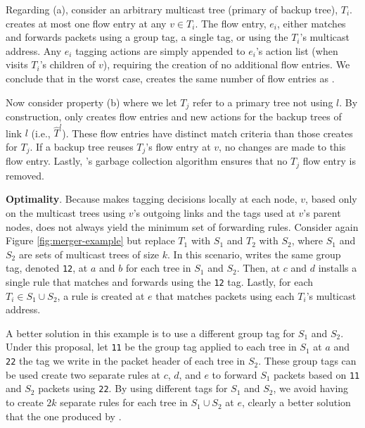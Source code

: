 Regarding (a), consider an arbitrary multicast tree (primary of backup tree), $T_i$. \merge creates at most one flow entry at any $v \in T_i$.  
The flow entry, $e_i$, either matches and forwards packets using a group tag, a single tag, or using the $T_i$'s multicast address.  Any $e_i$ tagging actions 
are simply appended to $e_i$'s action list (when \merge visits $T_i$'s children of $v$), requiring the creation of no additional flow entries.  We conclude that in the worst case,
\merge creates the same number of flow entries as \bases.  

Now consider property (b) where we let $T_j$ refer to a primary tree not using $l$. By construction, \merge only creates flow entries and new actions for the backup trees of 
link $l$ (i.e., $\hat{T}^l$). These flow entries have distinct match criteria than those \merge creates for $T_j$.  If a backup tree reuses $T_j$'s flow entry at $v$, 
no changes are made to this flow entry.  Lastly, \mdrs's garbage collection algorithm ensures that no $T_j$ flow entry is removed.



{\bf Optimality}.  
Because \merge makes tagging decisions locally at each node, $v$, based only on the multicast trees using $v$'s outgoing links and the tags used at $v$'s parent nodes,
\merge does not always yield the minimum set of forwarding rules.
Consider again Figure \ref{fig:merger-example} but replace $T_1$ with $S_1$ and $T_2$ with $S_2$, where $S_1$ and $S_2$ are sets of multicast trees of size $k$.
In this scenario, \merge writes the same group tag, denoted {\tt 12}, at $a$ and $b$ for each tree in $S_1$ and $S_2$.  Then, at $c$ and $d$ \merge installs a single rule that matches and forwards 
using the {\tt 12} tag.  Lastly, for each $T_i \in S_1 \cup S_2$, a rule is created at $e$ that matches packets using each $T_i$'s multicast address.  %

A better solution in this example is to use a different group tag for $S_1$ and $S_2$.  Under this proposal, let {\tt 11} be the group tag applied to each tree in $S_1$ 
at $a$ and {\tt 22} the tag we write 
in the packet header of each tree in $S_2$.  These group tags can be used create two separate rules at $c$, $d$, and $e$ to forward $S_1$ packets based on {\tt 11} and $S_2$ packets using {\tt 22}.
By using different tags for $S_1$ and $S_2$, we avoid having to create $2k$ separate rules for each tree in $S_1 \cup S_2$ at $e$, clearly a better solution that the 
one produced by \merges. 

